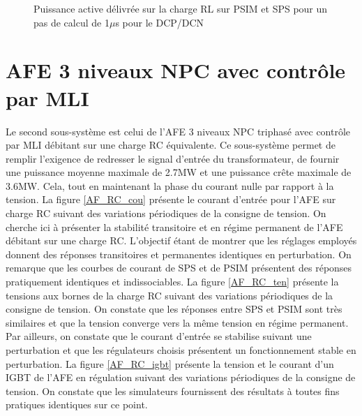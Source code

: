 \begin{figure}[htb]
\centering
{}
\caption{Puissance active délivrée sur la charge RL sur PSIM et SPS pour un pas de calcul de 1$\mu$s pour le DCP/DCN}
\label{DC_IG_ten_2}
\end{figure}

\clearpage
\section{AFE 3 niveaux NPC avec contrôle par MLI}

Le second sous-système est celui de l'AFE 3 niveaux NPC triphasé avec contrôle par MLI débitant sur une charge RC équivalente. Ce sous-système permet de remplir l'exigence de redresser le signal d'entrée du transformateur, de fournir une puissance moyenne maximale de 2.7MW et une puissance crête maximale de 3.6MW. Cela, tout en maintenant la phase du courant nulle par rapport à la tension. La figure \ref{AF_RC_cou} présente le courant d'entrée pour l'AFE sur charge RC suivant des variations périodiques de la consigne de tension. On cherche ici à présenter la stabilité transitoire et en régime permanent de l'AFE débitant sur une charge RC. L'objectif étant de montrer que les réglages employés donnent des réponses transitoires et permanentes identiques en perturbation. On remarque que les courbes de courant de SPS et de PSIM présentent des réponses pratiquement identiques et indissociables. La figure \ref{AF_RC_ten} présente la tensions aux bornes de la charge RC suivant des variations périodiques de la consigne de tension. On constate que les réponses entre SPS et PSIM sont très similaires et que la tension converge vers la même tension en régime permanent. Par ailleurs, on constate que le courant d'entrée se stabilise suivant une perturbation et que les régulateurs choisis présentent un fonctionnement stable en perturbation. La figure \ref{AF_RC_igbt}
présente la tension et le courant d'un IGBT de l'AFE en régulation suivant des variations périodiques de la consigne de tension. On constate que les simulateurs fournissent des résultats à toutes fins pratiques identiques sur ce point.


